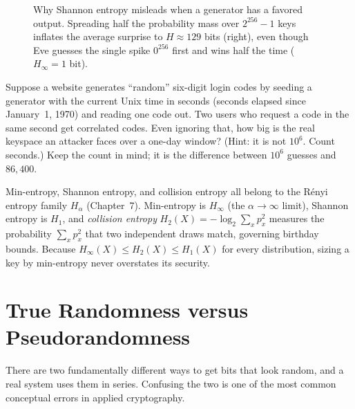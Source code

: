 \begin{figure}[htbp]
\caption{Why Shannon entropy misleads when a generator has a favored output. Spreading half the probability mass over $2^{256}-1$ keys inflates the average surprise to $H \approx 129$ bits (right), even though Eve guesses the single spike $0^{256}$ first and wins half the time ($H_\infty = 1$ bit).}
\label{ch17:fig-spiked-keyspace}
\end{figure}

\begin{walkbox}
Suppose a website generates ``random'' six-digit login codes by seeding a generator with the current Unix time in seconds (seconds elapsed since January~1, 1970) and reading one code out. Two users who request a code in the same second get correlated codes. Even ignoring that, how big is the real keyspace an attacker faces over a one-day window? (Hint: it is not $10^6$. Count seconds.) Keep the count in mind; it is the difference between $10^6$ guesses and $86{,}400$.
\end{walkbox}

\begin{connectionbox}
Min-entropy, Shannon entropy, and collision entropy all belong to the R\'enyi entropy family $H_\alpha$ (Chapter~7). Min-entropy is $H_\infty$ (the $\alpha\to\infty$ limit), Shannon entropy is $H_1$, and \emph{collision entropy} $H_2(X) = -\log_2 \sum_x p_x^2$ measures the probability $\sum_x p_x^2$ that two independent draws match, governing birthday bounds. Because $H_\infty(X) \le H_2(X) \le H_1(X)$ for every distribution, sizing a key by min-entropy never overstates its security.
\end{connectionbox}

\section{True Randomness versus Pseudorandomness}
\label{ch17:true-vs-pseudo}

There are two fundamentally different ways to get bits that look random, and a real system uses them in series. Confusing the two is one of the most common conceptual errors in applied cryptography.


